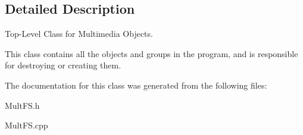 \subsection{Detailed Description}
Top-\/\+Level Class for Multimedia Objects. 

This class contains all the objects and groups in the program, and is responsible for destroying or creating them. 

The documentation for this class was generated from the following files\+:\begin{DoxyCompactItemize}
\item 
Mult\+F\+S.\+h\item 
Mult\+F\+S.\+cpp\end{DoxyCompactItemize}
